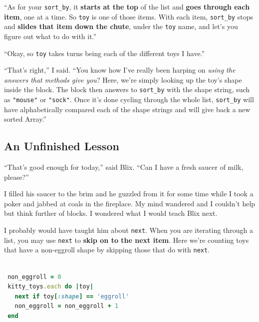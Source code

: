 \documentclass[10pt,twoside]{report}
\begin{document}
``As for your \lstinline[breaklines=true]|sort_by|, it {\bf starts at
  the top} of the list and {\bf goes through each item}, one at a
time. So \lstinline[breaklines=true]|toy| is one of those items.  With
each item, \lstinline[breaklines=true]|sort_by| stops and {\bf slides
  that item down the chute}, under the
\lstinline[breaklines=true]|toy| name, and let's you figure out what
to do with it.''

``Okay, so \lstinline[breaklines=true]|toy| takes turns being each of
the different toys I have.''

``That's right,'' I said.  ``You know how I've really been harping on
{\em using the answers that methods give you}?  Here, we're simply
looking up the toy's shape inside the block.  The block then answers
to \lstinline[breaklines=true]|sort_by| with the shape string, such as
\lstinline[breaklines=true]|"mouse"| or
\lstinline[breaklines=true]|"sock"|.  Once it's done cycling through
the whole list, \lstinline[breaklines=true]|sort_by| will have
alphabetically compared each of the shape strings and will give back a
new sorted Array.''



\subsection{ An Unfinished Lesson}



``That's good enough for today,'' said Blix.  ``Can I have a fresh
saucer of milk, please?''

I filled his saucer to the brim and he guzzled from it for some time
while I took a poker and jabbed at coals in the fireplace.  My mind
wandered and I couldn't help but think further of blocks.  I wondered
what I would teach Blix next.

I probably would have taught him about
\lstinline[breaklines=true]|next|.  When you are iterating through a
list, you may use \lstinline[breaklines=true]|next| to {\bf skip on to
  the next item}.  Here we're counting toys that have a non-eggroll
shape by skipping those that do with
\lstinline[breaklines=true]|next|.


\begin{lstlisting}[basicstyle=\ttfamily\color{basiccolor},
    commentstyle = \ttfamily\color{commentcolor},
    keywordstyle=\ttfamily\color{keywordscolor},
    stringstyle=\color{stringcolor},
    language=Ruby,
    basicstyle=\small\ttfamily,
    showstringspaces=false,
  ]

 non_eggroll = 0
 kitty_toys.each do |toy|
   next if toy[:shape] == 'eggroll'
   non_eggroll = non_eggroll + 1
 end

\end{lstlisting}
\end{document}
